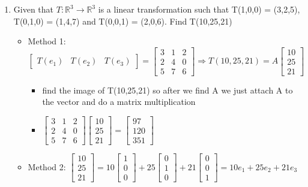 \documentclass[11pt]{article}
\begin{document}
\begin{enumerate}
\item Given that \(T: \mathbb{R}^{3} \rightarrow{} \mathbb{R}^{3}\) is a linear transformation such that T(1,0,0) = (3,2,5), T(0,1,0) = (1,4,7) and T(0,0,1) = (2,0,6). Find T(10,25,21)
\begin{itemize}
\item Method 1: \(\begin{bmatrix}T(e_{1})&T(e_{2})&T(e_{3})\end{bmatrix} = \begin{bmatrix}3&1&2\\2&4&0\\5&7&6\end{bmatrix} \Rightarrow{} T(10,25,21) = A\begin{bmatrix}10\\25\\21\end{bmatrix}\)
\begin{itemize}
\item find the image of T(10,25,21) so after we find A we just attach A to the vector and do a matrix multiplication
\item \(\begin{bmatrix}3&1&2\\2&4&0\\5&7&6\end{bmatrix}\begin{bmatrix}10\\25\\21\end{bmatrix}=\begin{bmatrix}97\\120\\351\end{bmatrix}\)
\end{itemize}
\item Method 2: \(\begin{bmatrix}10\\25\\21\end{bmatrix} = 10\begin{bmatrix}1\\0\\0\end{bmatrix} + 25\begin{bmatrix}0\\1\\0\end{bmatrix} + 21\begin{bmatrix}0\\0\\1\end{bmatrix} = 10e_{1} + 25e_{2} + 21e_{3}\)

\end{itemize}
\end{enumerate}
\end{document}
